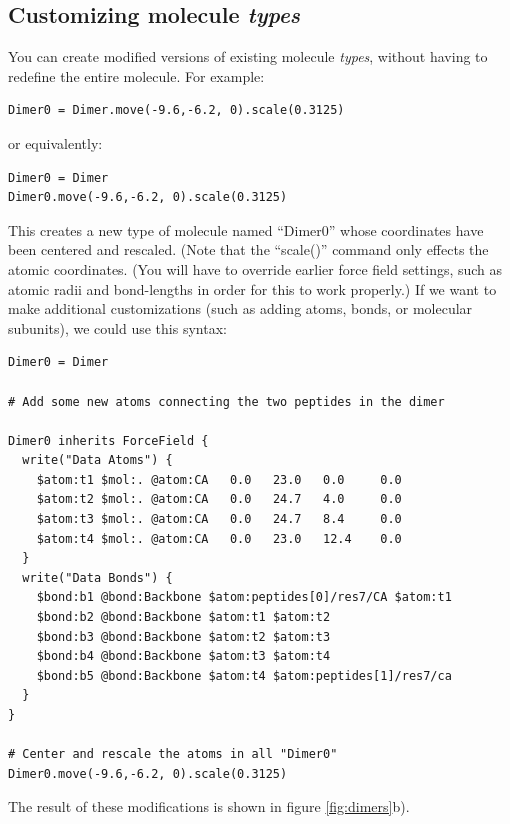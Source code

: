 \documentclass[11pt]{article}
\begin{document}
\subsection{Customizing molecule \textit{types}}
\label{sec:molecule_customization}
You can create modified versions of existing molecule \textit{types}, 
without having to redefine the entire molecule. For example:
\begin{verbatim}
Dimer0 = Dimer.move(-9.6,-6.2, 0).scale(0.3125)
\end{verbatim}
or equivalently:
\begin{verbatim}
Dimer0 = Dimer
Dimer0.move(-9.6,-6.2, 0).scale(0.3125)
\end{verbatim}
This creates a new type of molecule named ``Dimer0'' whose 
coordinates have been centered and rescaled.
(Note that the ``scale()'' command only effects the atomic coordinates.
(You will have to override earlier force field settings,
such as atomic radii and bond-lengths in order for this to work properly.)
If we want to make additional customizations
(such as adding atoms, bonds, or molecular subunits), we could use this syntax:
\begin{verbatim}
Dimer0 = Dimer

# Add some new atoms connecting the two peptides in the dimer

Dimer0 inherits ForceField {
  write("Data Atoms") {
    $atom:t1 $mol:. @atom:CA   0.0   23.0   0.0     0.0
    $atom:t2 $mol:. @atom:CA   0.0   24.7   4.0     0.0
    $atom:t3 $mol:. @atom:CA   0.0   24.7   8.4     0.0
    $atom:t4 $mol:. @atom:CA   0.0   23.0   12.4    0.0
  }
  write("Data Bonds") {
    $bond:b1 @bond:Backbone $atom:peptides[0]/res7/CA $atom:t1
    $bond:b2 @bond:Backbone $atom:t1 $atom:t2
    $bond:b3 @bond:Backbone $atom:t2 $atom:t3
    $bond:b4 @bond:Backbone $atom:t3 $atom:t4
    $bond:b5 @bond:Backbone $atom:t4 $atom:peptides[1]/res7/ca
  }
}

# Center and rescale the atoms in all "Dimer0"
Dimer0.move(-9.6,-6.2, 0).scale(0.3125)
\end{verbatim}
The result of these modifications is shown in figure \ref{fig:dimers}b).
\end{document}
